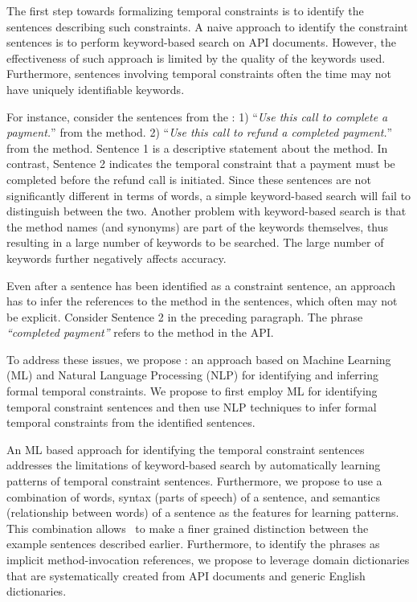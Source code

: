 The first step towards formalizing temporal constraints is to identify the sentences describing such constraints.
A naive approach to identify the constraint sentences is to perform keyword-based search on API documents.
However, the effectiveness of such approach is limited by the quality of the keywords used.
Furthermore, sentences involving temporal constraints often the time may not have uniquely identifiable keywords.

For instance, consider the sentences from the \paypalAPI:
1) ``\textit{Use this call to complete a payment.}'' from the  method.
2) ``\textit{Use this call to refund a completed payment.}'' from the  method.
Sentence 1 is a descriptive statement about the  method.
In contrast, Sentence 2 indicates the temporal constraint that a payment must be completed before the refund call is initiated.
Since these sentences are not significantly different in terms of words, a simple keyword-based search will fail to distinguish between the two. 
Another problem with keyword-based search is that the method names (and synonyms) are part of the keywords themselves, thus resulting in a large number of keywords to be searched.
The large number of keywords further negatively affects accuracy.

Even after a sentence has been identified as a constraint sentence, an approach has to infer the references to the method in the sentences, which often may not be explicit. Consider Sentence 2 in the preceding paragraph. The phrase \textit{``completed payment''} refers to the  method in the API.

To address these issues, we propose \tool: an approach based on Machine Learning (ML) and Natural Language Processing (NLP)
for identifying and inferring formal temporal constraints.
We propose to first employ ML for identifying temporal constraint sentences and then use NLP techniques to infer formal temporal constraints from the identified sentences. 

An ML based approach for identifying the temporal constraint sentences addresses the limitations of keyword-based search by automatically learning patterns of temporal constraint sentences.
Furthermore, we propose to use a combination of words, syntax (parts of speech) of a sentence, and semantics (relationship between words) of a sentence as the features for learning patterns.
This combination allows \tool\ to make a finer grained distinction between the example sentences described earlier.
Furthermore, to identify the phrases as implicit method-invocation references, we propose to leverage domain dictionaries that are systematically created from API documents and generic English dictionaries.

